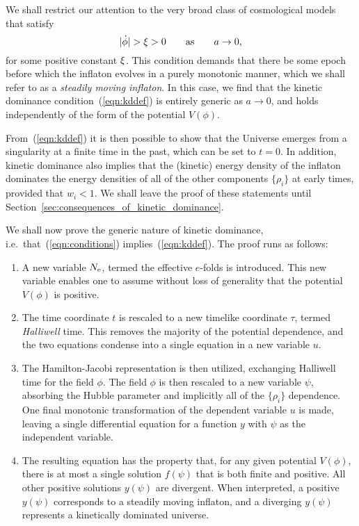 We shall restrict our attention to the very broad class of cosmological models that satisfy
%
\begin{equation}
|\dot{\phi}| > \xi > 0 \qquad \text{as} \qquad a\to 0, 
\label{eqn:conditions}
\end{equation}
%
for some positive constant $\xi$.  This condition demands that there be some epoch before which the inflaton evolves in a purely monotonic manner, which we shall refer to as a {\em steadily moving inflaton}. In this case, we find that the kinetic dominance condition~(\ref{eqn:kddef}) is entirely generic as $a \to 0$, and holds independently of the form of the potential $V(\phi)$.

From~(\ref{eqn:kddef}) it is then possible to show that the Universe emerges from a singularity at a finite time in the past, which can be set to $t=0$. In addition, kinetic dominance also implies that the (kinetic) energy density of the inflaton dominates the energy densities of all of the other components $\{\rho_i\}$ at early times, provided that $w_i<1$. We shall leave the proof of these statements until Section~\ref{sec:consequences_of_kinetic_dominance}. 

We shall now prove the generic nature of kinetic dominance, i.e.\ that~(\ref{eqn:conditions}) implies~(\ref{eqn:kddef}). The proof runs as follows:
%
\renewcommand{\theenumi}{\Alph{enumi}}
%
\begin{enumerate}
  \item                                        
    A new variable $N_\mathrm{e}$, termed the effective $e$-folds is introduced. This new variable enables one to assume without loss of generality that the potential $V(\phi)$ is positive.
  \item
    The time coordinate $t$ is rescaled to a new timelike coordinate $\tau$, termed {\em Halliwell}\/ time. This removes the majority of the potential dependence, and the two equations condense into a single equation in a new variable $u$.
  \item
    The Hamilton-Jacobi representation is then utilized, exchanging Halliwell time for the field $\phi$. The field $\phi$ is then rescaled to a new variable $\psi$, absorbing the Hubble parameter and implicitly all of the $\{\rho_i\}$ dependence. One final monotonic transformation of the dependent variable $u$ is made, leaving a single differential equation for a function $y$ with $\psi$ as the independent variable.
  \item
    The resulting equation has the property that, for any given potential $V(\phi)$, there is at most a single solution $f(\psi)$ that is both finite and positive. All other positive solutions $y(\psi)$ are divergent.  When interpreted, a positive $y(\psi)$ corresponds to a steadily moving inflaton, and a diverging $y(\psi)$ represents a kinetically dominated universe.
\end{enumerate}
%


